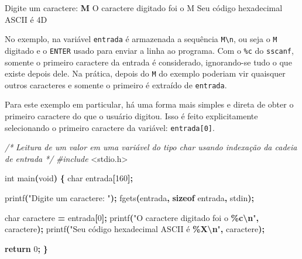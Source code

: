 \documentclass[
  11pt,
  a4paper,
]{scrbook}
\newenvironment{Shaded}{\begin{snugshade}}{\end{snugshade}}
\newcommand{\CommentTok}[1]{\textcolor[rgb]{0.56,0.35,0.01}{\textit{#1}}}
\newcommand{\ControlFlowTok}[1]{\textcolor[rgb]{0.13,0.29,0.53}{\textbf{#1}}}
\newcommand{\DataTypeTok}[1]{\textcolor[rgb]{0.13,0.29,0.53}{#1}}
\newcommand{\DecValTok}[1]{\textcolor[rgb]{0.00,0.00,0.81}{#1}}
\newcommand{\ImportTok}[1]{#1}
\newcommand{\KeywordTok}[1]{\textcolor[rgb]{0.13,0.29,0.53}{\textbf{#1}}}
\newcommand{\NormalTok}[1]{#1}
\newcommand{\OperatorTok}[1]{\textcolor[rgb]{0.81,0.36,0.00}{\textbf{#1}}}
\newcommand{\PreprocessorTok}[1]{\textcolor[rgb]{0.56,0.35,0.01}{\textit{#1}}}
\newcommand{\SpecialCharTok}[1]{\textcolor[rgb]{0.81,0.36,0.00}{\textbf{#1}}}
\newcommand{\StringTok}[1]{\textcolor[rgb]{0.31,0.60,0.02}{#1}}
\begin{document}
\begin{Shaded}
\begin{Highlighting}[]
\NormalTok{Digite um caractere: }\KeywordTok{ M }
\NormalTok{O caractere digitado foi o M}
\NormalTok{Seu código hexadecimal ASCII é 4D}
\end{Highlighting}
\end{Shaded}

No exemplo, na variável \texttt{entrada} é armazenada a sequência
\texttt{M\textbackslash{}n}, ou seja o \texttt{M} digitado e o
\texttt{ENTER} usado para enviar a linha ao programa. Com o \texttt{\%c}
do \texttt{sscanf}, somente o primeiro caractere da entrada é
considerado, ignorando-se tudo o que existe depois dele. Na prática,
depois do \texttt{M} do exemplo poderiam vir quaisquer outros caracteres
e somente o primeiro é extraído de \texttt{entrada}.

Para este exemplo em particular, há uma forma mais simples e direta de
obter o primeiro caractere do que o usuário digitou. Isso é feito
explicitamente selecionando o primeiro caractere da variável:
\texttt{entrada{[}0{]}}.

\begin{Shaded}
\begin{Highlighting}[]
\CommentTok{/*}
\CommentTok{Leitura de um valor em uma variável do tipo char usando indexação da cadeia}
\CommentTok{de entrada}
\CommentTok{*/}
\PreprocessorTok{\#include }\ImportTok{\textless{}stdio.h\textgreater{}}

\DataTypeTok{int}\NormalTok{ main}\OperatorTok{(}\DataTypeTok{void}\OperatorTok{)} \OperatorTok{\{}
    \DataTypeTok{char}\NormalTok{ entrada}\OperatorTok{[}\DecValTok{160}\OperatorTok{];}

\NormalTok{    printf}\OperatorTok{(}\StringTok{"Digite um caractere: "}\OperatorTok{);}
\NormalTok{    fgets}\OperatorTok{(}\NormalTok{entrada}\OperatorTok{,} \KeywordTok{sizeof}\NormalTok{ entrada}\OperatorTok{,}\NormalTok{ stdin}\OperatorTok{);}

    \DataTypeTok{char}\NormalTok{ caractere }\OperatorTok{=}\NormalTok{ entrada}\OperatorTok{[}\DecValTok{0}\OperatorTok{];}
\NormalTok{    printf}\OperatorTok{(}\StringTok{"O caractere digitado foi o }\SpecialCharTok{\%c\textbackslash{}n}\StringTok{"}\OperatorTok{,}\NormalTok{ caractere}\OperatorTok{);}
\NormalTok{    printf}\OperatorTok{(}\StringTok{"Seu código hexadecimal ASCII é }\SpecialCharTok{\%X\textbackslash{}n}\StringTok{"}\OperatorTok{,}\NormalTok{ caractere}\OperatorTok{);}

    \ControlFlowTok{return} \DecValTok{0}\OperatorTok{;}
\OperatorTok{\}}
\end{Highlighting}
\end{Shaded}
\end{document}
